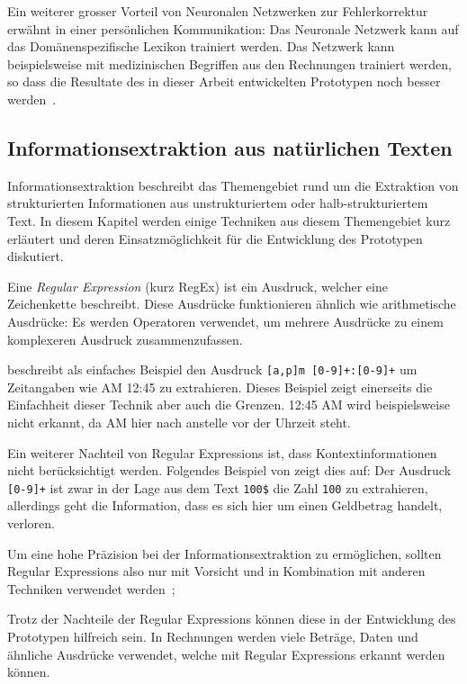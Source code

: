 Ein weiterer grosser Vorteil von Neuronalen Netzwerken zur Fehlerkorrektur erwähnt \textcite{Mugan2018} in einer persönlichen Kommunikation: Das Neuronale Netzwerk kann auf das Domänenspezifische Lexikon trainiert werden. Das Netzwerk kann beispielsweise mit medizinischen Begriffen aus den Rechnungen trainiert werden, so dass die Resultate des in dieser Arbeit entwickelten Prototypen noch besser werden~\autocite{Mugan2018}.

\subsection{Informationsextraktion aus natürlichen Texten}


Informationsextraktion beschreibt das Themengebiet rund um die Extraktion von strukturierten Informationen aus unstrukturiertem oder halb-strukturiertem Text. In diesem Kapitel werden einige Techniken aus diesem Themengebiet kurz erläutert und deren Ein\-satz\-mög\-lich\-keit für die Entwicklung des Prototypen diskutiert.

Eine \textit{Regular Expression} (kurz RegEx) ist ein Ausdruck, welcher eine Zeichenkette beschreibt. Diese Ausdrücke funktionieren ähnlich wie arithmetische Ausdrücke: Es werden Operatoren verwendet, um mehrere Ausdrücke zu einem komplexeren Ausdruck zusammenzufassen\autocite{Xiao2004}.

\textcite{Xiao2004} beschreibt als einfaches Beispiel den Ausdruck \texttt{[a,p]m [0-9]+:[0-9]+} um Zeitangaben wie AM 12:45 zu extrahieren. Dieses Beispiel zeigt einerseits die Einfachheit dieser Technik aber auch die Grenzen. 12:45 AM wird beispielsweise nicht erkannt, da AM hier nach anstelle vor der Uhrzeit steht. 

Ein weiterer Nachteil von Regular Expressions ist, dass Kontextinformationen nicht be\-rück\-sich\-tigt werden. Folgendes Beispiel von \textcite{Xiao2004} zeigt dies auf: Der Ausdruck \texttt{[0-9]+} ist zwar in der Lage aus dem Text \texttt{100\$} die Zahl \texttt{100} zu extrahieren, allerdings geht die Information, dass es sich hier um einen Geldbetrag handelt, verloren.

Um eine hohe Präzision bei der Informationsextraktion zu ermöglichen, sollten Regular Expressions also nur mit Vorsicht und in Kombination mit anderen Techniken verwendet werden~\autocite{Xiao2004};

Trotz der Nachteile der Regular Expressions können diese in der Entwicklung des Prototypen hilfreich sein. In Rechnungen werden viele Beträge, Daten und ähnliche Ausdrücke verwendet, welche mit Regular Expressions erkannt werden können.

